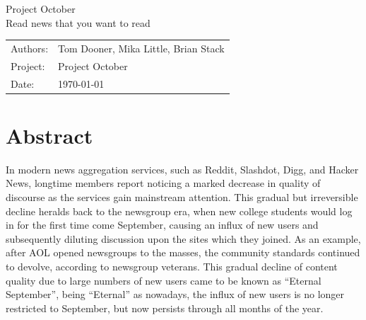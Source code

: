 \documentclass[11pt,letterpaper]{article}
\begin{document}

\newpage
\pagestyle{fancy}
\fancyhf{}
\vspace*{6cm}
\begin{center}
\Huge  {Project October}\\
\vspace{1cm}
\huge {Read news that you want to read}\\
\vspace{1cm}
\end{center}
\vfill
\begin{flushright}
\begin{tabular}{ll}
Authors: & Tom Dooner, Mika Little, Brian Stack\\
Project: & Project October\\
Date: & \today
\end{tabular}
\end{flushright}

\newpage
\pagestyle{fancy}
\fancyhf{}

\fancyhead[L]{\small \rm \textit{\rightmark}}
\fancyhead[R]{\small \rm \textbf{\thepage}}



\renewcommand{\sectionmark}[1]{\markright{\thesection.\ #1}}
\renewcommand{\headrulewidth}{0.5pt}
\renewcommand{\footrulewidth}{0.5pt}


\tableofcontents
\listoffigures

\newpage
\section{Abstract}

In modern news aggregation services, such as Reddit, Slashdot, Digg, and Hacker News, longtime members report noticing a marked decrease in quality of discourse as the services gain mainstream attention.
This gradual but irreversible decline heralds back to the newsgroup era, when new college students would log in for the first time come September, causing an influx of new users and subsequently diluting discussion upon the sites which they joined.
As an example, after AOL opened newsgroups to the masses, the community standards continued to
devolve, according to newsgroup veterans\cite{september}. This gradual decline of content quality due to
large numbers of new users came to be known as ``Eternal September'', being ``Eternal'' as nowadays,
the influx of new users is no longer restricted to September, but now persists through all months of the year.
\end{document}
